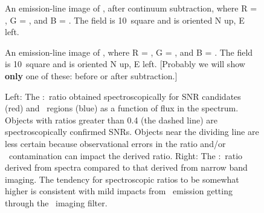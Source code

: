 


\pagebreak



\clearpage

\startlongtable



\pagebreak
%

\begin{figure}
\caption{An emission-line image of \gal, after continuum subtraction, where R = \ha, G = \sii, and B = \oiii.  The field is 10\arcmin\ square and is oriented N up, E left. \label{fig_overview} }
\end{figure}

\begin{figure}
\caption{An emission-line image of \gal, where R = \ha, G = \sii, and B = \oiii.  The field is 10\arcmin\ square and is oriented N up, E left.  [Probably we will show {\bf only} one of these: before or after subtraction.] }
\end{figure}

\begin{figure}
\caption{Left: The \sii:\ha\ ratio obtained spectroscopically for SNR candidates (red) and \hii\ regions (blue) as a function of \ha flux in the spectrum.  Objects with ratios greater than 0.4 (the dashed line) are spectroscopically confirmed SNRs.  Objects near the dividing line are less certain because observational errors in the ratio and/or \hii\ contamination can impact the derived ratio. Right: The \sii:\ha\ ratio derived from spectra compared to that derived from narrow band imaging.  The tendency for spectroscopic ratios to be somewhat higher is consistent with mild impacts from \nii\ emission getting through the \ha\ imaging filter.  \label{fig_s2_ha}}

\end{figure}

